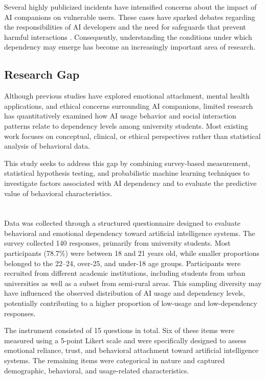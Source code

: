 \documentclass[10pt,a4paper]{article}
\begin{document}
Several highly publicized incidents have intensified concerns about the impact of AI companions on vulnerable users. These cases have sparked debates regarding the responsibilities of AI developers and the need for safeguards that prevent harmful interactions \cite{ref2,ref3}. Consequently, understanding the conditions under which dependency may emerge has become an increasingly important area of research.

\subsection{Research Gap}

Although previous studies have explored emotional attachment, mental health applications, and ethical concerns surrounding AI companions, limited research has quantitatively examined how AI usage behavior and social interaction patterns relate to dependency levels among university students. Most existing work focuses on conceptual, clinical, or ethical perspectives rather than statistical analysis of behavioral data.

This study seeks to address this gap by combining survey-based measurement, statistical hypothesis testing, and probabilistic machine learning techniques to investigate factors associated with AI dependency and to evaluate the predictive value of behavioral characteristics.

\pagebreak

\section{{\color{colorIPN}{Research Method}}}
Data was collected through a structured questionnaire designed to evaluate behavioral and emotional dependency toward artificial intelligence systems. The survey collected 140 responses, primarily from university students. Most participants (78.7\%) were between 18 and 21 years old, while smaller proportions belonged to the 22--24, over-25, and under-18 age groups. Participants were recruited from different academic institutions, including students from urban universities as well as a subset from semi-rural areas. This sampling diversity may have influenced the observed distribution of AI usage and dependency levels, potentially contributing to a higher proportion of low-usage and low-dependency responses.

The instrument consisted of 15 questions in total. Six of these items were measured using a 5-point Likert scale and were specifically designed to assess emotional reliance, trust, and behavioral attachment toward artificial intelligence systems. The remaining items were categorical in nature and captured demographic, behavioral, and usage-related characteristics.
\end{document}
